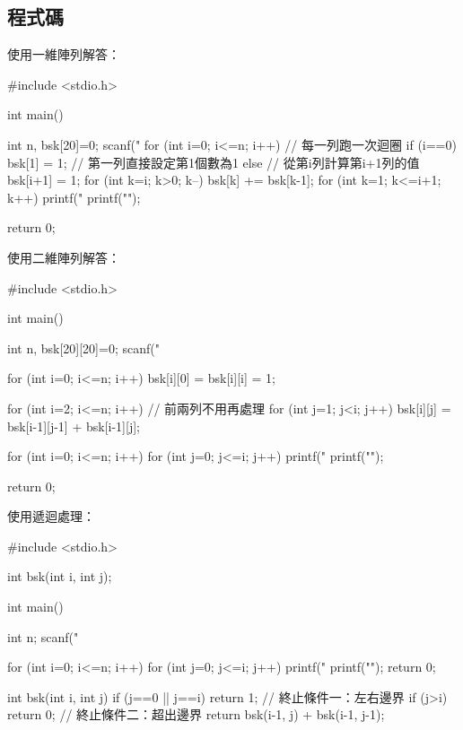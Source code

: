 \subsection{程式碼}
使用一維陣列解答：
\begin{cppcode}
#include <stdio.h>

int main()
{
	int n, bsk[20]={0};
	scanf("%
	for (int i=0; i<=n; i++) { // 每一列跑一次迴圈
		if (i==0) bsk[1] = 1; // 第一列直接設定第1個數為1
		else { // 從第i列計算第i+1列的值
			bsk[i+1] = 1;
			for (int k=i; k>0; k--) bsk[k] += bsk[k-1];
		}
		for (int k=1; k<=i+1; k++) printf(" %
		printf("\n");
	}
	
	return 0;
}
\end{cppcode}
使用二維陣列解答：
\begin{cppcode}
	#include <stdio.h>
	
	int main()
	{
		int n, bsk[20][20]={{0}};
		scanf("%
		
		for (int i=0; i<=n; i++) bsk[i][0] = bsk[i][i] = 1;
		
		for (int i=2; i<=n; i++) { // 前兩列不用再處理
			for (int j=1; j<i; j++) {
				bsk[i][j] = bsk[i-1][j-1] + bsk[i-1][j];
			}
		}
		
		for (int i=0; i<=n; i++) {
			for (int j=0; j<=i; j++) {
				printf(" %
			}
			printf("\n");
		}
		
		return 0;
	}
\end{cppcode}
使用遞迴處理：
\begin{cppcode}
#include <stdio.h>

int bsk(int i, int j);

int main()
{
	int n;
	scanf("%
	
	for (int i=0; i<=n; i++) {
		for (int j=0; j<=i; j++) printf(" %
		printf("\n");
	}
	return 0;
}

int bsk(int i, int j)
{
	if (j==0 || j==i) return 1; // 終止條件一：左右邊界
	if (j>i) return 0; // 終止條件二：超出邊界
	return bsk(i-1, j) + bsk(i-1, j-1);
}
\end{cppcode}